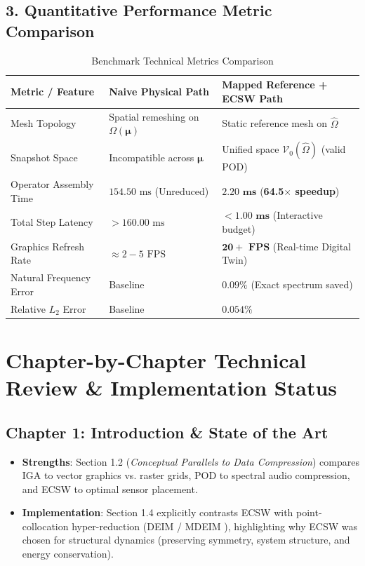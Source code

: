 \documentclass[11pt,a4paper]{article}
\begin{document}
\subsection*{3. Quantitative Performance Metric Comparison}
\begin{table}[htbp]
\centering
\caption{Benchmark Technical Metrics Comparison}
\vspace{0.5em}
\small
\begin{tabularx}{\textwidth}{>{\raggedright\arraybackslash}p{3.5cm} >{\raggedright\arraybackslash}p{4cm} >{\raggedright\arraybackslash}X}
\toprule
\textbf{Metric / Feature} & \textbf{Naive Physical Path} & \textbf{Mapped Reference + ECSW Path} \\
\midrule
Mesh Topology & Spatial remeshing on $\Omega(\boldsymbol{\mu})$ & Static reference mesh on $\hat{\Omega}$ \\
Snapshot Space & Incompatible across $\boldsymbol{\mu}$ & Unified space $\mathcal{V}_0(\hat{\Omega})$ (valid POD) \\
Operator Assembly Time & $154.50\text{ ms}$ (Unreduced) & $\mathbf{2.20\text{ ms}}$ (\textbf{64.5$\times$ speedup}) \\
Total Step Latency & $> 160.00\text{ ms}$ & $\mathbf{< 1.00\text{ ms}}$ (Interactive budget) \\
Graphics Refresh Rate & $\approx 2 - 5\text{ FPS}$ & $\mathbf{20+\text{ FPS}}$ (Real-time Digital Twin) \\
Natural Frequency Error & Baseline & $\mathbf{0.09\%}$ (Exact spectrum saved) \\
Relative $L_2$ Error & Baseline & $\mathbf{0.054\%}$ \\
\bottomrule
\end{tabularx}
\end{table}

\section{Chapter-by-Chapter Technical Review \& Implementation Status}

\subsection*{Chapter 1: Introduction \& State of the Art}
\begin{itemize}
    \item \textbf{Strengths}: Section 1.2 (\textit{Conceptual Parallels to Data Compression}) compares IGA to vector graphics vs. raster grids, POD to spectral audio compression, and ECSW to optimal sensor placement.
    \item \textbf{Implementation}: Section 1.4 explicitly contrasts ECSW with point-collocation hyper-reduction (DEIM / MDEIM \cite{Chaturantabut2010, Bonomi2017}), highlighting why ECSW was chosen for structural dynamics (preserving symmetry, system structure, and energy conservation).
\end{itemize}
\end{document}
